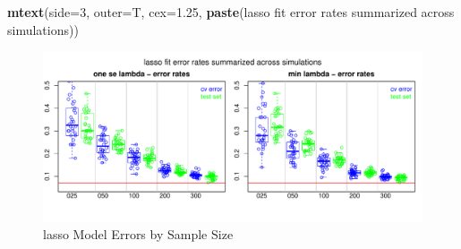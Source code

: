 \documentclass[
]{book}
\newenvironment{Shaded}{\begin{snugshade}}{\end{snugshade}}
\newcommand{\DataTypeTok}[1]{\textcolor[rgb]{0.13,0.29,0.53}{#1}}
\newcommand{\DecValTok}[1]{\textcolor[rgb]{0.00,0.00,0.81}{#1}}
\newcommand{\FloatTok}[1]{\textcolor[rgb]{0.00,0.00,0.81}{#1}}
\newcommand{\KeywordTok}[1]{\textcolor[rgb]{0.13,0.29,0.53}{\textbf{#1}}}
\newcommand{\NormalTok}[1]{#1}
\newcommand{\StringTok}[1]{\textcolor[rgb]{0.31,0.60,0.02}{#1}}
\begin{document}
\begin{Shaded}
\begin{Highlighting}[]
\KeywordTok{mtext}\NormalTok{(}\DataTypeTok{side=}\DecValTok{3}\NormalTok{, }\DataTypeTok{outer=}\NormalTok{T, }\DataTypeTok{cex=}\FloatTok{1.25}\NormalTok{, }\KeywordTok{paste}\NormalTok{(}\StringTok{\textquotesingle{}lasso fit error rates summarized across simulations\textquotesingle{}}\NormalTok{))}
\end{Highlighting}
\end{Shaded}

\begin{figure}
\centering
\includegraphics{Static/figures/lasso-simRes-errors-overSim-1.pdf}
\caption{\label{fig:lasso-simRes-errors-overSim}lasso Model Errors by Sample Size}
\end{figure}
\end{document}
